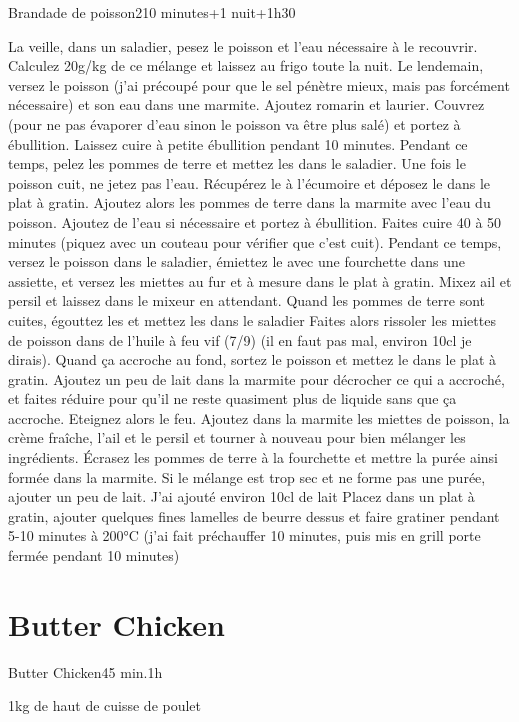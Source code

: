 {\begin{recette}{Brandade de poisson}{2}{10 minutes+1 nuit+1h30}{}
\begin{preparation}
\etape La veille, dans un saladier, pesez le poisson et l'eau nécessaire à le recouvrir. Calculez 20g/kg de ce mélange et laissez au frigo toute la nuit. 
\etape Le lendemain, versez le poisson (j'ai précoupé pour que le sel pénètre mieux, mais pas forcément nécessaire) et son eau dans une marmite. Ajoutez romarin et laurier.  
\etape Couvrez (pour ne pas évaporer d'eau sinon le poisson va être plus salé) et portez à ébullition.
\etape Laissez cuire à petite ébullition pendant 10 minutes.
\etape Pendant ce temps, pelez les pommes de terre et mettez les dans le saladier. 
\etape Une fois le poisson cuit, ne jetez pas l'eau. Récupérez le à l'écumoire et déposez le dans le plat à gratin. 
\etape Ajoutez alors les pommes de terre dans la marmite avec l'eau du poisson. Ajoutez de l'eau si nécessaire et portez à ébullition. Faites cuire 40 à 50 minutes (piquez avec un couteau pour vérifier que c'est cuit). 
\etape Pendant ce temps, versez le poisson dans le saladier, émiettez le avec une fourchette dans une assiette, et versez les miettes au fur et à mesure dans le plat à gratin. 
\etape Mixez ail et persil et laissez dans le mixeur en attendant. 
\etape Quand les pommes de terre sont cuites, égouttez les et mettez les dans le saladier
\etape Faites alors rissoler les miettes de poisson dans de l'huile à feu vif (7/9) (il en faut pas mal, environ 10cl je dirais). 
\etape Quand ça accroche au fond, sortez le poisson et mettez le dans le plat à gratin. 
\etape Ajoutez un peu de lait dans la marmite pour décrocher ce qui a accroché, et faites réduire pour qu'il ne reste quasiment plus de liquide sans que ça accroche. 
\etape Eteignez alors le feu. Ajoutez dans la marmite les miettes de poisson, la crème fraîche, l'ail et le persil et tourner à nouveau pour bien mélanger les ingrédients.
\etape Écrasez les pommes de terre à la fourchette et mettre la purée ainsi formée dans la marmite.
 Si le mélange est trop sec et ne forme 
pas une purée, ajouter un peu de lait. J'ai ajouté environ 10cl de lait
\etape Placez dans un plat à gratin, ajouter quelques fines lamelles de beurre dessus et faire gratiner pendant 5-10 minutes à 
200°C (j'ai fait préchauffer 10 minutes, puis mis en grill porte fermée pendant 10 minutes)
\end{preparation}
\end{recette}

\section{Butter Chicken}
\begin{recette}{Butter Chicken}{}{45 min.}{1h}
\begin{ingredients}
\ingredient 1kg de haut de cuisse de poulet


\end{ingredients}
\end{recette}}
